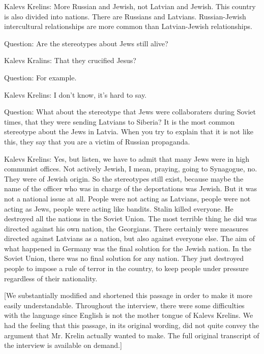 Kalevs Krelins: More Russian and Jewish, not Latvian and Jewish. This country is also divided into nations. There are Russians and Latvians. Russian-Jewish intercultural relationships are more common than Latvian-Jewish relationships.    

Question: Are the stereotypes about Jews still alive? 

Kalevs Kralins: That they crucified Jesus? 

Question: For example.  

Kalevs Krelins: I don’t know, it's hard to say.  

Question: What about the stereotype that Jews were collaboraters during Soviet times, that they were sending Latvians to Siberia? It is the most common stereotype about the Jews in Latvia.  When you try to explain that it is not like this, they say that you are a victim of Russian propaganda.  

Kalevs Krelins: Yes, but listen, we have to admit that many Jews were in high communist offices. Not actively Jewish, I mean, praying, going to Synagogue, no. They were of Jewish origin. So the stereotypes still exist, because maybe the name of the officer who was in charge of the deportations was Jewish. But it was not a national issue at all. People were not acting as Latvians, people were not acting as Jews, people were acting like bandits. Stalin killed everyone. He destroyed all the nations in the Soviet Union. The most terrible thing he did was directed against his own nation, the Georgians. There certainly were measures directed against Latvians as a nation, but also against everyone else. The aim of what happened in Germany was the final solution for the Jewish nation. In the Soviet Union, there was no final solution for any nation. They just destroyed people to impose a rule of terror in the country, to keep people under pressure regardless of their nationality. 

[We substantially modified and shortened this passage in order to make it more easily understandable. Throughout the interview, there were some difficulties with the language since English is not the mother tongue of Kalevs Krelins. We had the feeling that this passage, in its original wording, did not quite convey the argument that Mr. Krelin actually wanted to make. The full original transcript of the interview is available on demand.] 

 

  

 

 

 

 

 

 

 

 

 

 

 